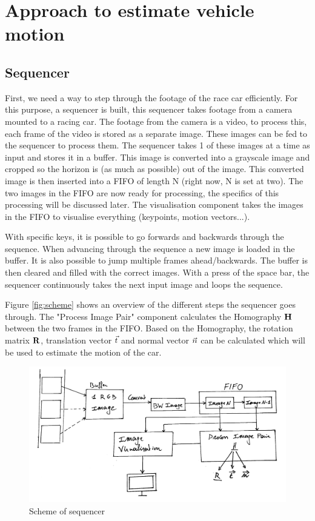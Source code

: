 \chapter{Approach to estimate vehicle motion}

\section{Sequencer}
First, we need a way to step through the footage of the race car efficiently. For this purpose, a sequencer is built, this sequencer takes footage from a camera mounted to a racing car. The footage from the camera is a video, to process this, each frame of the video is stored as a separate image. These images can be fed to the sequencer to process them. The sequencer takes 1 of these images at a time as input and stores it in a buffer. This image is converted into a grayscale image and cropped so the horizon is (as much as possible) out of the image. This converted image is then inserted into a FIFO of length N (right now, N is set at two). The two images in the FIFO are now ready for processing, the specifics of this processing will be discussed later. The visualisation component takes the images in the FIFO to visualise everything (keypoints, motion vectors...).\bigskip

With specific keys, it is possible to go forwards and backwards through the sequence. When advancing through the sequence a new image is loaded in the buffer. It is also possible to jump multiple frames ahead/backwards. The buffer is then cleared and filled with the correct images. With a press of the space bar, the sequencer continuously takes the next input image and loops the sequence.\bigskip

Figure \autoref{fig:scheme} shows an overview of the different steps the sequencer goes through. The "Process Image Pair" component calculates the Homography $\mathbf{H}$ between the two frames in the FIFO. Based on the Homography, the rotation matrix $\mathbf{R}$, translation vector $\vec t$ and normal vector $\vec n$ can be calculated which will be used to estimate the motion of the car.

\begin{figure}
    \centering
    \includegraphics[width=1\textwidth]{figures/Block_diagram_sequencer.jpg}
    \caption{Scheme of sequencer}
    \label{fig:scheme}
\end{figure}

